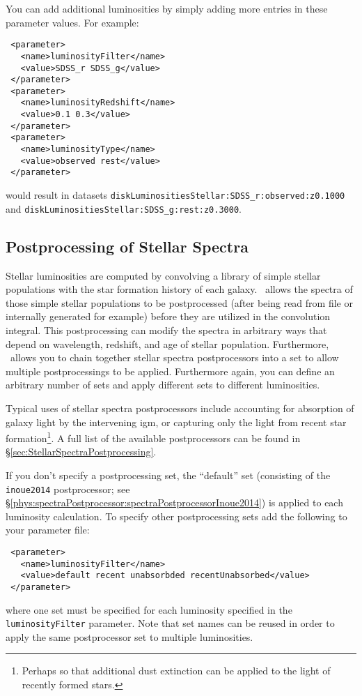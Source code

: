 You can add additional luminosities by simply adding more entries in these parameter values. For example:
\begin{verbatim}
 <parameter>
   <name>luminosityFilter</name>
   <value>SDSS_r SDSS_g</value>
 </parameter>
 <parameter>
   <name>luminosityRedshift</name>
   <value>0.1 0.3</value>
 </parameter>
 <parameter>
   <name>luminosityType</name>
   <value>observed rest</value>
 </parameter>
\end{verbatim}
would result in datasets {\tt diskLuminositiesStellar:SDSS\_r:observed:z0.1000} and {\tt diskLuminositiesStellar:SDSS\_g:rest:z0.3000}. 

\subsection{Postprocessing of Stellar Spectra}

Stellar luminosities are computed by convolving a library of simple stellar populations with the star formation history of each galaxy. \glc\ allows the spectra of those simple stellar populations to be postprocessed (after being read from file or internally generated for example) before they are utilized in the convolution integral. This postprocessing can modify the spectra in arbitrary ways that depend on wavelength, redshift, and age of stellar population. Furthermore, \glc\ allows you to chain together stellar spectra postprocessors into a set to allow multiple postprocessings to be applied. Furthermore again, you can define an arbitrary number of sets and apply different sets to different luminosities.

Typical uses of stellar spectra postprocessors include accounting for absorption of galaxy light by the intervening \gls{igm}, or capturing only the light from recent star formation\footnote{Perhaps so that additional dust extinction can be applied to the light of recently formed stars.}. A full list of the available postprocessors can be found in \S\ref{sec:StellarSpectraPostprocessing}.

If you don't specify a postprocessing set, the ``default'' set (consisting of the {\tt inoue2014} postprocessor; see \S\ref{phys:spectraPostprocessor:spectraPostprocessorInoue2014}) is applied to each luminosity calculation. To specify other postprocessing sets add the following to your parameter file:
\begin{verbatim}
 <parameter>
   <name>luminosityFilter</name>
   <value>default recent unabsorbded recentUnabsorbed</value>
 </parameter>
\end{verbatim}
where one set must be specified for each luminosity specified in the {\tt luminosityFilter} parameter. Note that set names can be reused in order to apply the same postprocessor set to multiple luminosities.

